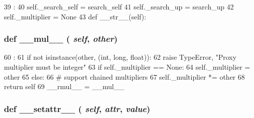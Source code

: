 \begin{DoxyCode}
39                                               :
40         self._search_self = search_self
41         self._search_up = search_up
42         self._multiplier = None
43 
    def __str__(self):
\end{DoxyCode}
\hypertarget{classm5_1_1proxy_1_1BaseProxy_a48a7267a9f9d29d1514e713744202146}{
\subsubsection[{\_\-\_\-mul\_\-\_\-}]{\setlength{\rightskip}{0pt plus 5cm}def \_\-\_\-mul\_\-\_\- ( {\em self}, \/   {\em other})}}
\label{classm5_1_1proxy_1_1BaseProxy_a48a7267a9f9d29d1514e713744202146}



\begin{DoxyCode}
60                             :
61         if not isinstance(other, (int, long, float)):
62             raise TypeError, "Proxy multiplier must be integer"
63         if self._multiplier == None:
64             self._multiplier = other
65         else:
66             # support chained multipliers
67             self._multiplier *= other
68         return self
69 
    __rmul__ = __mul__
\end{DoxyCode}
\hypertarget{classm5_1_1proxy_1_1BaseProxy_a6287b7a16286568d5442b6e2e90215b5}{
\subsubsection[{\_\-\_\-setattr\_\-\_\-}]{\setlength{\rightskip}{0pt plus 5cm}def \_\-\_\-setattr\_\-\_\- ( {\em self}, \/   {\em attr}, \/   {\em value})}}
\label{classm5_1_1proxy_1_1BaseProxy_a6287b7a16286568d5442b6e2e90215b5}



